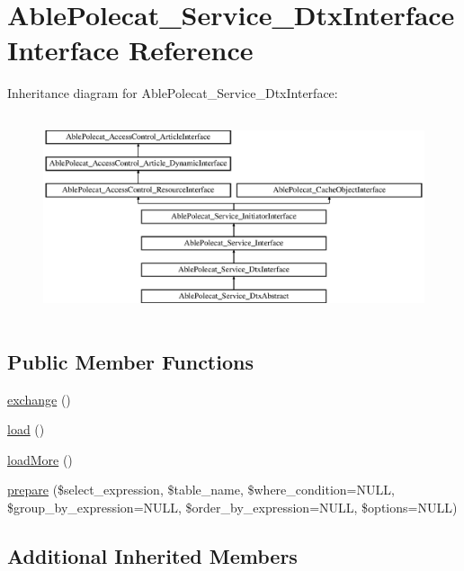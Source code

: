 \hypertarget{interface_able_polecat___service___dtx_interface}{}\section{Able\+Polecat\+\_\+\+Service\+\_\+\+Dtx\+Interface Interface Reference}
\label{interface_able_polecat___service___dtx_interface}
Inheritance diagram for Able\+Polecat\+\_\+\+Service\+\_\+\+Dtx\+Interface\+:\begin{figure}[H]
\begin{center}
\leavevmode
\includegraphics[height=5.975610cm]{interface_able_polecat___service___dtx_interface}
\end{center}
\end{figure}
\subsection*{Public Member Functions}
\begin{DoxyCompactItemize}
\item 
\hyperlink{interface_able_polecat___service___dtx_interface_afc72385e75fba1d3387ba75389d58d4d}{exchange} ()
\item 
\hyperlink{interface_able_polecat___service___dtx_interface_a4dcaa8f72c8423d4de25a9e87fa6f3e4}{load} ()
\item 
\hyperlink{interface_able_polecat___service___dtx_interface_ab5a46d6d7f1795a26153dc59a28b9881}{load\+More} ()
\item 
\hyperlink{interface_able_polecat___service___dtx_interface_a70c9cadf3e9e3b2576447e1667e9d511}{prepare} (\$select\+\_\+expression, \$table\+\_\+name, \$where\+\_\+condition=N\+U\+L\+L, \$group\+\_\+by\+\_\+expression=N\+U\+L\+L, \$order\+\_\+by\+\_\+expression=N\+U\+L\+L, \$options=N\+U\+L\+L)
\end{DoxyCompactItemize}
\subsection*{Additional Inherited Members}



